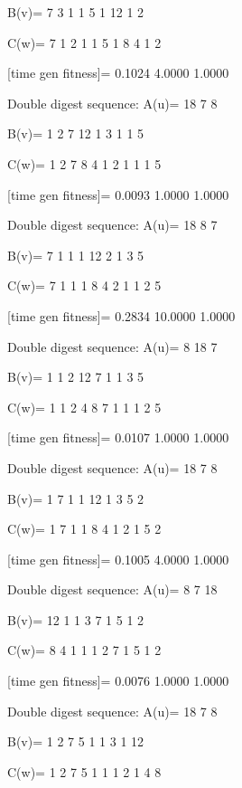 B(v)=
     7     3     1     1     5     1    12     1     2

C(w)=
     7     1     2     1     1     5     1     8     4     1     2

[time gen fitness]=
    0.1024    4.0000    1.0000

Double digest sequence:
A(u)=
    18     7     8

B(v)=
     1     2     7    12     1     3     1     1     5

C(w)=
     1     2     7     8     4     1     2     1     1     1     5

[time gen fitness]=
    0.0093    1.0000    1.0000

Double digest sequence:
A(u)=
    18     8     7

B(v)=
     7     1     1     1    12     2     1     3     5

C(w)=
     7     1     1     1     8     4     2     1     1     2     5

[time gen fitness]=
    0.2834   10.0000    1.0000

Double digest sequence:
A(u)=
     8    18     7

B(v)=
     1     1     2    12     7     1     1     3     5

C(w)=
     1     1     2     4     8     7     1     1     1     2     5

[time gen fitness]=
    0.0107    1.0000    1.0000

Double digest sequence:
A(u)=
    18     7     8

B(v)=
     1     7     1     1    12     1     3     5     2

C(w)=
     1     7     1     1     8     4     1     2     1     5     2

[time gen fitness]=
    0.1005    4.0000    1.0000

Double digest sequence:
A(u)=
     8     7    18

B(v)=
    12     1     1     3     7     1     5     1     2

C(w)=
     8     4     1     1     1     2     7     1     5     1     2

[time gen fitness]=
    0.0076    1.0000    1.0000

Double digest sequence:
A(u)=
    18     7     8

B(v)=
     1     2     7     5     1     1     3     1    12

C(w)=
     1     2     7     5     1     1     1     2     1     4     8

